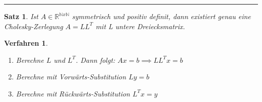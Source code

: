 \documentclass[a4paper]{article}
\newcounter{Sec}
\theoremstyle{marginbreak}
\newtheorem{satz}[definition]{Satz}
\newtheorem{verfahren}[definition]{Verfahren}
\newcommand{\sep}{%
	\rule{\textwidth}{0.3pt}%
	\stepcounter{Sec}%
}
\begin{document}
	\sep
	\begin{satz}
		Ist $ A \in \mathbb{R}^{\mathbb{N}x\mathbb{N}}$ symmetrisch und positiv definit, dann existiert genau eine Cholesky-Zerlegung $A=LL^T$ mit L untere Dreiecksmatrix.
	\end{satz}
	\begin{verfahren}
		\begin{enumerate}
			\item Berechne $L$ und $L^T$. Dann folgt: $Ax = b \implies LL^Tx = b $
			\item Berechne mit Vorwärts-Substitution $Ly = b$
			\item Berechne mit Rückwärts-Substitution $L^Tx = y$
		\end{enumerate}
	\end{verfahren}
\end{document}
